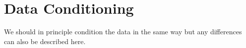 \section{Data Conditioning}
\label{sec:conditioning}
We should in principle condition the data in the same way but any differences
can also be described here. 